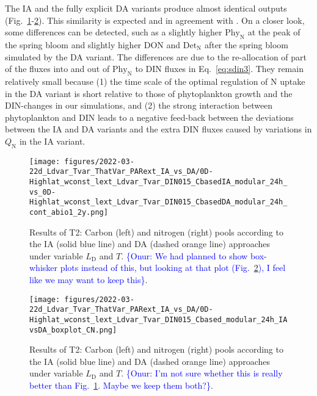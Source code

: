 \documentclass[gmd, manuscript]{copernicus}
\newcommand{\onur}[1]{\textcolor{blue}{\{Onur: #1\}}}
\begin{document}

The IA and the fully explicit DA variants produce almost identical outputs (Fig.~\ref{f.T2res}-\ref{f.T2resbox}). This similarity is expected and in agreement with \citet{Ward2017}. On a closer look, some differences can be detected, such as a slightly higher $\text{Phy}_{\text{N}}$ at the peak of the spring bloom and slightly higher DON and $\text{Det}_{\text{N}}$ after the spring bloom simulated by the DA variant.  The differences are due to the re-allocation of part of the fluxes into and out of $\text{Phy}_{\text{N}}$ to DIN fluxes in Eq.~\eqref{eq:sdin3}.  They remain relatively small because (1) the time scale of the optimal regulation of N uptake in the DA variant is short relative to those of phytoplankton growth and the DIN-changes in our simulations, and (2) the strong interaction between phytoplankton and DIN leads to a negative feed-back between the deviations between the IA and DA variants and the extra DIN fluxes caused by variations in $Q_{\text{N}}$ in the IA variant.

\begin{figure}[htb!]
\texttt{[image: figures/2022-03-22d\_Ldvar\_Tvar\_ThatVar\_PARext\_IA\_vs\_DA/0D-Highlat\_wconst\_lext\_Ldvar\_Tvar\_DIN015\_CbasedIA\_modular\_24h\_vs\_0D-Highlat\_wconst\_lext\_Ldvar\_Tvar\_DIN015\_CbasedDA\_modular\_24h\_cont\_abio1\_2y.png]}
\caption{Results of T2: Carbon (left) and nitrogen (right) pools according to the IA (solid blue line) and DA (dashed orange line) approaches under variable $L_{\text{D}}$ and $T$. \onur{We had planned to show box-whisker plots instead of this, but looking at that plot (Fig.~\ref{f.T2resbox}), I feel like we may want to keep this}.\label{f.T2res}}
\end{figure}

\begin{figure}[htb!]
\texttt{[image: figures/2022-03-22d\_Ldvar\_Tvar\_ThatVar\_PARext\_IA\_vs\_DA/0D-Highlat\_wconst\_lext\_Ldvar\_Tvar\_DIN015\_Cbased\_modular\_24h\_IAvsDA\_boxplot\_CN.png]}
\caption{Results of T2: Carbon (left) and nitrogen (right) pools according to the IA (solid blue line) and DA (dashed orange line) approaches under variable $L_{\text{D}}$ and $T$. \onur{I'm not sure whether this is really better than Fig.~\ref{f.T2res}. Maybe we keep them both?}.\label{f.T2resbox}}
\end{figure}
\end{document}
